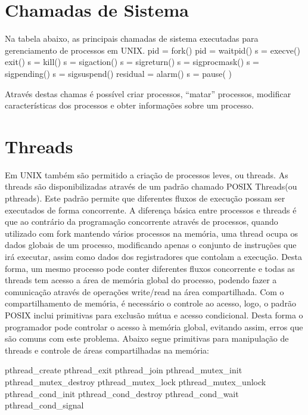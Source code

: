 \section{Chamadas de Sistema}
Na tabela abaixo, as principais chamadas de sistema executadas para gerenciamento de processos em UNIX.
	pid = fork()   
	pid = waitpid()
	s = execve()
	exit()
	s = kill()
	s = sigaction()                    
	s = sigreturn()
	s = sigprocmask()
	s = sigpending()
	s = sigsuspend()               
	residual = alarm()
	s = pause( )

Através destas chamas é possível criar processos, “matar” processos, modificar características dos processos e obter informações sobre um processo.

\section{Threads}
Em UNIX também são permitido a criação de processos leves, ou threads. As threads são disponibilizadas através de um padrão chamado POSIX Threads(ou pthreads). Este padrão permite que diferentes fluxos de execução possam ser executados de forma concorrente. A diferença básica entre processos e threads é que ao contrário da programação concorrente através de processos, quando utilizado com fork mantendo vários processos na memória, uma thread ocupa os dados globais de um processo, modificando apenas o conjunto de instruções que irá executar, assim como dados dos registradores que contolam a execução. Desta forma, um mesmo processo pode conter diferentes fluxos concorrente e todas as threads tem acesso a área de memória global do processo, podendo fazer a comunicação através de operações write/read na área compartilhada. Com o compartilhamento de memória, é necessário o controle ao acesso, logo, o padrão POSIX inclui primitivas para exclusão mútua e acesso condicional. Desta forma o programador pode controlar o acesso à memória global, evitando assim, erros que são comuns com este problema. Abaixo segue primitivas para manipulação de threads e controle de áreas compartilhadas na memória:

	pthread_create\(\)
	pthread_exit
	pthread_join
	pthread_mutex_init
	pthread_mutex_destroy
	pthread_mutex_lock
	pthread_mutex_unlock
	pthread_cond_init
	pthread_cond_destroy
	pthread_cond_wait
	pthread_cond_signal

